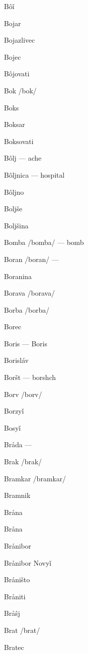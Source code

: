 Bôǐ 

Bojar 

Bojazlivec 

Bojec 

Bôjovati 

Bok /bok/

Boks 

Boksar 

Boksovati 

Bôlj  — ache

Bôljnica  — hospital

Bôljno 

Boljše 

Boljšina 

Bomba /bomba/ — bomb

Boran /boran/ —

Boranina 

Borava /borava/

Borba /borba/

Borec 

Boris  — Boris

Borisláv 

Boršt  — borshch

Borv /borv/

Borzyǐ 

Bosyǐ 

Bråda  —

Brak /brak/

Bramkar /bramkar/

Bramnik 

Bråna 

Bråna 

Brånibor 

Brånibor Novyǐ 

Bråništo 

Bråniti 

Bråŝj 

Brat /brat/

Bratec 

